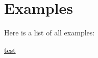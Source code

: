 \section{Examples}
Here is a list of all examples\+:\begin{DoxyCompactItemize}
\item 
\hyperlink{test-example}{test}
\end{DoxyCompactItemize}
